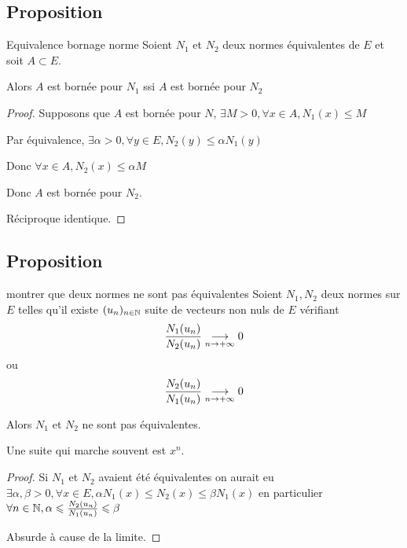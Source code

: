 \subsection{Proposition}

\begin{proposition}{Equivalence bornage norme}{}
    Soient $N_1$ et $N_2$ deux normes équivalentes de $E$ et soit $A \subset E$. 

    Alors $A$ est bornée pour $N_1$ ssi $A$ est bornée pour $N_2$
\end{proposition}


\begin{proof}
    Supposons que $A$ est bornée pour $N$, $\exists M > 0, \forall x \in A, N_1(x) \leqslant M$

    Par équivalence, $\exists \alpha > 0, \forall y \in E, N_2(y) \leqslant \alpha N_1(y)$

    Donc $\forall x \in A, N_2(x) \leqslant \alpha M$

    Donc $A$ est bornée pour $N_2$.

    Réciproque identique.
\end{proof}

\subsection{Proposition}

\begin{proposition}{montrer que deux normes ne sont pas équivalentes}{}
    Soient $N_1, N_2$ deux normes sur $E$ telles qu'il existe $(u_n)_{n \in \mathbb{N}}$ suite
    de vecteurs non nuls de $E$ vérifiant 
    $$ \frac{N_1(u_n )}{N_2(u_n )} \underset{n \to + \infty}{\longrightarrow} 0$$ 
    ou $$\frac{N_2(u_n )}{N_1(u_n )} \underset{n \to + \infty}{\longrightarrow} 0$$

    Alors $N_1$ et $N_2$ ne sont pas équivalentes.
\end{proposition}

\begin{remarque}
    Une suite qui marche souvent est $x^n$.
\end{remarque}


\begin{proof}
    Si $N_1$ et $N_2$ avaient été équivalentes on aurait eu 
    $\exists \alpha, \beta > 0, \forall x \in E, \alpha N_1(x) \leqslant N_2(x) \leqslant \beta N_1(x)$
    en particulier $\forall n \in \mathbb{N}, \alpha \leqslant \frac{N_2(u_n)}{N_1(u_n)} \leqslant \beta$

    Absurde à cause de la limite.
\end{proof}


